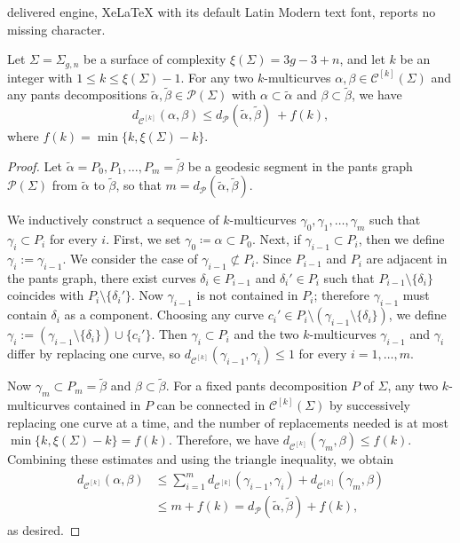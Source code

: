 \documentclass[10pt,a4paper]{amsart}
\newcommand{\multicurve}[1]{\mathcal{C}^{[#1]}}
\begin{document}
delivered engine, XeLaTeX with its default Latin Modern text font, reports no missing character.
\begin{lemma}\label{lemma:UpperBoundForK-multicurveDistance}
Let $\Sigma=\Sigma_{g,n}$ be a surface of complexity $\xi(\Sigma)=3g-3+n$, and let $k$ be an integer with $1\le k\le \xi(\Sigma)-1$.
For any two $k$-multicurves $\alpha,\beta\in\multicurve{k}(\Sigma)$ and any pants decompositions
$\tilde{\alpha},\tilde{\beta}\in\mathcal{P}(\Sigma)$ with $\alpha\subset\tilde{\alpha}$ and $\beta\subset\tilde{\beta}$, we have
\begin{equation*}
    d_{\multicurve{k}}(\alpha,\beta)\leq d_{\mathcal{P}}(\tilde{\alpha},\tilde{\beta})\ +f(k),
\end{equation*}
where $f(k)=\min\{k, \xi(\Sigma)-k\}$.

\end{lemma}

\begin{proof}
Let $\tilde{\alpha}=P_0,P_1,\ldots,P_m=\tilde{\beta}$ be a geodesic segment in the pants graph $\mathcal{P}(\Sigma)$ from $\tilde{\alpha}$ to $\tilde{\beta}$, so that
$m=d_{\mathcal{P}}(\tilde{\alpha},\tilde{\beta})$.

We inductively construct a sequence of $k$-multicurves $\gamma_0,\gamma_1,\ldots,\gamma_m $ such that
$\gamma_i\subset P_i$ for every $i$.
First, we set $\gamma_0\coloneqq \alpha\subset P_0$.
Next, if $\gamma_{i-1}\subset P_i$, then we define $\gamma_i:=\gamma_{i-1}$.
We consider the case of $\gamma_{i-1}\not\subset P_i$.
Since $P_{i-1}$ and $P_i$ are adjacent in the pants graph, there exist curves $\delta_i\in P_{i-1}$ and $\delta_i'\in P_i$ such that $P_{i-1}\setminus\{\delta_i\}$ coincides with $P_i\setminus\{\delta_i'\}$.
Now $\gamma_{i-1}$ is not contained in $P_i$; therefore $\gamma_{i-1}$ must contain $\delta_i$ as a component.
Choosing any curve $c_i'\in P_i\setminus(\gamma_{i-1}\setminus\{\delta_i\})$,
we define $\gamma_i:=(\gamma_{i-1}\setminus\{\delta_i\})\cup\{c_i'\}$.
Then $\gamma_i\subset P_i$ and the two $k$-multicurves $\gamma_{i-1}$ and $\gamma_i$ differ by replacing one curve, so $d_{\multicurve{k}}(\gamma_{i-1},\gamma_i)\leq 1$ for every $i=1,\ldots,m$.

Now $\gamma_m\subset P_m=\tilde{\beta}$ and $\beta\subset \tilde{\beta}$.
For a fixed pants decomposition $P$ of $\Sigma$, any two $k$-multicurves contained in $P$ can be
connected in $\multicurve{k}(\Sigma)$ by successively replacing one curve at a time, and the number of
replacements needed is at most $\min\{k,\xi(\Sigma)-k\}=f(k)$.
Therefore, we have $d_{\multicurve{k}}(\gamma_m,\beta)\le f(k)$.
Combining these estimates and using the triangle inequality, we obtain
\begin{align*}
    d_{\multicurve{k}}(\alpha,\beta) &\leq \sum_{i=1}^m d_{\multicurve{k}}(\gamma_{i-1},\gamma_i) + d_{\multicurve{k}}(\gamma_m,\beta) \\
    & \leq m+f(k) =d_{\mathcal{P}}(\tilde{\alpha},\tilde{\beta})+f(k),
\end{align*}
as desired.
\end{proof}
\end{document}
